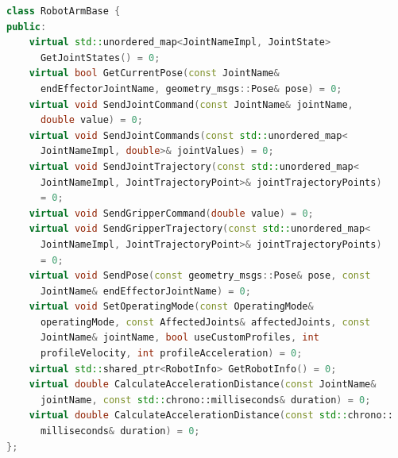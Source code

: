 \begin{lstlisting}[language=C++, caption={\quoteMark{RobotArmBase}-Programmierschnittstelle zur Anbindung einer Tiefenkamera}, label={lst:robot_arm_base_interface}]
class RobotArmBase {
public:
    virtual std::unordered_map<JointNameImpl, JointState>
      GetJointStates() = 0;
    virtual bool GetCurrentPose(const JointName&
      endEffectorJointName, geometry_msgs::Pose& pose) = 0;
    virtual void SendJointCommand(const JointName& jointName,
      double value) = 0;
    virtual void SendJointCommands(const std::unordered_map<
      JointNameImpl, double>& jointValues) = 0;
    virtual void SendJointTrajectory(const std::unordered_map<
      JointNameImpl, JointTrajectoryPoint>& jointTrajectoryPoints)
      = 0;
    virtual void SendGripperCommand(double value) = 0;
    virtual void SendGripperTrajectory(const std::unordered_map<
      JointNameImpl, JointTrajectoryPoint>& jointTrajectoryPoints)
      = 0;
    virtual void SendPose(const geometry_msgs::Pose& pose, const
      JointName& endEffectorJointName) = 0;
    virtual void SetOperatingMode(const OperatingMode&
      operatingMode, const AffectedJoints& affectedJoints, const
      JointName& jointName, bool useCustomProfiles, int
      profileVelocity, int profileAcceleration) = 0;
    virtual std::shared_ptr<RobotInfo> GetRobotInfo() = 0;
    virtual double CalculateAccelerationDistance(const JointName&
      jointName, const std::chrono::milliseconds& duration) = 0;
    virtual double CalculateAccelerationDistance(const std::chrono::
      milliseconds& duration) = 0;
};
\end{lstlisting}\leavevmode\newline\vspace{-1.0em}

